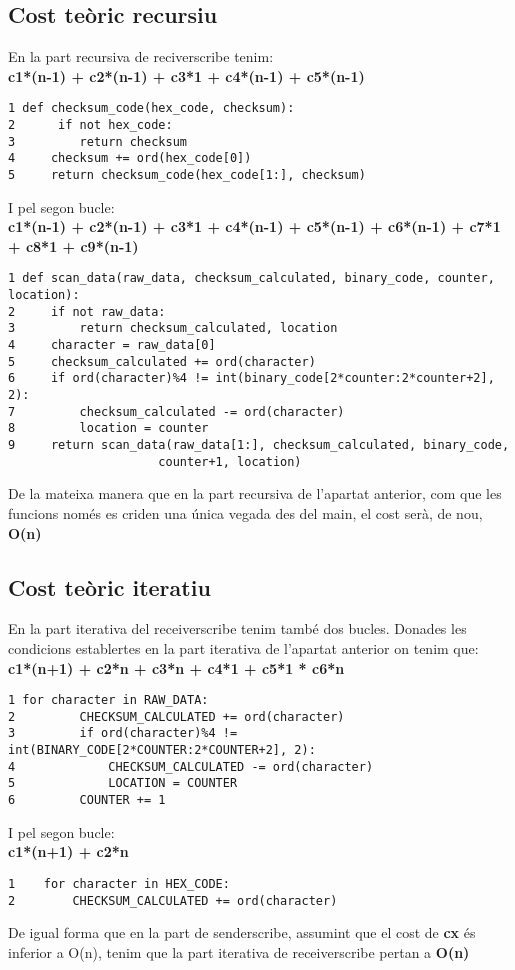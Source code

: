 \documentclass{article}
\begin{document}
\subsection{Cost teòric recursiu}
En la part recursiva de reciverscribe tenim:\\
\textbf{c1*(n-1) + c2*(n-1) + c3*1 + c4*(n-1) + c5*(n-1)}
\begin{lstlisting}
1 def checksum_code(hex_code, checksum):
2      if not hex_code:
3         return checksum
4     checksum += ord(hex_code[0])
5     return checksum_code(hex_code[1:], checksum)
\end{lstlisting}
I pel segon bucle:\\
\textbf{c1*(n-1) + c2*(n-1) + c3*1 + c4*(n-1) + c5*(n-1) + c6*(n-1) +
c7*1 + c8*1 + c9*(n-1)}
\begin{lstlisting}
1 def scan_data(raw_data, checksum_calculated, binary_code, counter, location):
2     if not raw_data:
3         return checksum_calculated, location
4     character = raw_data[0]
5     checksum_calculated += ord(character)
6     if ord(character)%4 != int(binary_code[2*counter:2*counter+2], 2):
7         checksum_calculated -= ord(character)
8         location = counter
9     return scan_data(raw_data[1:], checksum_calculated, binary_code,
                     counter+1, location)
\end{lstlisting}
De la mateixa manera que en la part recursiva de l'apartat anterior,
com que les funcions només es criden una única vegada des del main,
el cost serà, de nou, \textbf{O(n)}
\subsection{Cost teòric iteratiu}
En la part iterativa del receiverscribe tenim també dos bucles.
Donades les condicions establertes en la part iterativa de 
l'apartat anterior on tenim que:\\
\textbf{c1*(n+1) + c2*n + c3*n + c4*1 + c5*1 * c6*n}
\begin{lstlisting}
1 for character in RAW_DATA:
2         CHECKSUM_CALCULATED += ord(character)
3         if ord(character)%4 != int(BINARY_CODE[2*COUNTER:2*COUNTER+2], 2):
4             CHECKSUM_CALCULATED -= ord(character)
5             LOCATION = COUNTER
6         COUNTER += 1
\end{lstlisting}
I pel segon bucle:\\
\textbf{c1*(n+1) + c2*n}
\begin{lstlisting}
1    for character in HEX_CODE:
2        CHECKSUM_CALCULATED += ord(character)
\end{lstlisting}
De igual forma que en la part de senderscribe, assumint que el cost 
de \textbf{cx} és inferior a O(n), tenim que la part iterativa de 
receiverscribe pertan a \textbf{O(n)}
\end{document}
